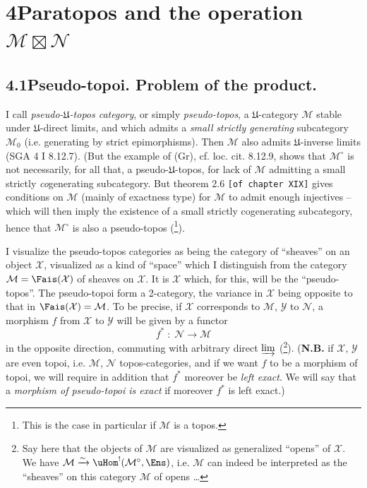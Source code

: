 

\section*{4\quad Paratopos and the operation $\mathcal{M}\boxtimes\mathcal{N}$}

\subsection*{4.1\quad Pseudo-topoi. Problem of the product.}

I call \textit{pseudo-$\mathfrak{U}$-topos category}, or simply \textit{pseudo-topos}, a $\mathfrak{U}$-category $\mathcal{M}$ stable under $\mathfrak{U}$-direct limits, and which admits a \textit{small} \textit{strictly generating} subcategory $\mathcal{M}_0$ (i.e. generating by strict epimorphisms). Then $\mathcal{M}$ also admits $\mathfrak{U}$-inverse limits (SGA 4 I 8.12.7). (But the example of (Gr), cf. loc. cit. 8.12.9, shows that $\mathcal{M}^\circ$ is not necessarily, for all that, a pseudo-$\mathfrak{U}$-topos, for lack of $\mathcal{M}$ admitting a small strictly \textit{co}generating subcategory. But theorem 2.6 \texttt{[of chapter XIX]} gives conditions on $\mathcal{M}$ (mainly of exactness type) %
for $\mathcal{M}$ to admit enough injectives -- which will then imply the existence of a small strictly cogenerating subcategory, hence that $\mathcal{M}^\circ$ is also a pseudo-topos (\footnote{This is the case in particular if $\mathcal{M}$ is a topos.}).

I visualize the pseudo-topos categories as being the category of ``sheaves'' on an object $\mathcal{X}$, visualized as a kind of ``space'' which I distinguish from the category $\mathcal{M}=\Fais(\mathcal{X})$ of sheaves on $\mathcal{X}$. It is $\mathcal{X}$ which, for this, will be the ``pseudo-topos''. The pseudo-topoi form a 2-category, the variance in $\mathcal{X}$ being opposite to that in $\Fais(\mathcal{X})=\mathcal{M}$. To be precise, if $\mathcal{X}$ corresponds to $\mathcal{M}$, $\mathcal{Y}$ to $\mathcal{N}$, a morphism $f$ from $\mathcal{X}$ to $\mathcal{Y}$ will be given by a functor
\[
f^* \;:\; \mathcal{N} \longrightarrow \mathcal{M}
\tag*{(4.1.1)}
\]
in the opposite direction, commuting with arbitrary direct $\varinjlim$ (\footnote{Say here that the objects of $\mathcal{M}$ are visualized as generalized ``opens'' of $\mathcal{X}$. We have $\mathcal{M}\xrightarrow{\sim}\uHom^!(\mathcal{M}^\circ,\Ens)$, i.e. $\mathcal{M}$ can indeed be interpreted as the ``sheaves'' on this category $\mathcal{M}$ of opens \ldots}). (\textbf{N.B.} if $\mathcal{X}$, $\mathcal{Y}$ are even topoi, i.e. $\mathcal{M}$, $\mathcal{N}$ topos-categories, and if we want $f$ to be a morphism of topoi, we will require in addition that $f^*$ moreover be \textit{left exact}. We will say that a \textit{morphism of pseudo-topoi is exact} if moreover $f^*$ is left exact.)

